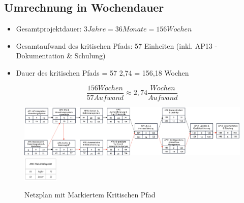 \subsection{Umrechnung in Wochendauer}
\begin{itemize}
	\item Gesamtprojektdauer: $3 Jahre = 36 Monate = 156 Wochen$
	\item Gesamtaufwand des kritischen Pfads: 57 Einheiten (inkl. AP13 - Dokumentation \& Schulung)
	\item Dauer des kritischen Pfads = 57 2,74 = 156,18 Wochen
\end{itemize}
\[
	\frac{156 Wochen}{57 Aufwand} \approx 2,74 \frac{Wochen}{Aufwand}
\]
\begin{figure}[ht]
	\centering
	\includegraphics[width=1\textwidth]{fig/Netzplan.png}
	\includegraphics[width=0.15\textwidth]{fig/Netzplan info.png}
	\caption{Netzplan mit Markiertem Kritischen Pfad}
	\label{fig:netzplan}
\end{figure}
\pagebreak

